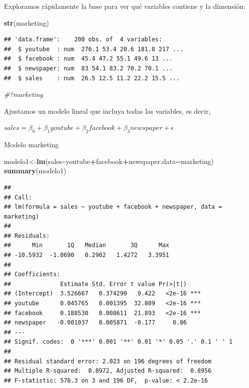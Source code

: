 \documentclass[
]{book}
\newenvironment{Shaded}{\begin{snugshade}}{\end{snugshade}}
\newcommand{\AttributeTok}[1]{\textcolor[rgb]{0.13,0.29,0.53}{#1}}
\newcommand{\CommentTok}[1]{\textcolor[rgb]{0.56,0.35,0.01}{\textit{#1}}}
\newcommand{\FunctionTok}[1]{\textcolor[rgb]{0.13,0.29,0.53}{\textbf{#1}}}
\newcommand{\NormalTok}[1]{#1}
\newcommand{\OtherTok}[1]{\textcolor[rgb]{0.56,0.35,0.01}{#1}}
\newcommand{\SpecialCharTok}[1]{\textcolor[rgb]{0.81,0.36,0.00}{\textbf{#1}}}
\begin{document}
Exploramos rápidamente la base para ver qué variables contiene y la dimensión:

\begin{Shaded}
\begin{Highlighting}[]
\FunctionTok{str}\NormalTok{(marketing)}
\end{Highlighting}
\end{Shaded}

\begin{verbatim}
## 'data.frame':    200 obs. of  4 variables:
##  $ youtube  : num  276.1 53.4 20.6 181.8 217 ...
##  $ facebook : num  45.4 47.2 55.1 49.6 13 ...
##  $ newspaper: num  83 54.1 83.2 70.2 70.1 ...
##  $ sales    : num  26.5 12.5 11.2 22.2 15.5 ...
\end{verbatim}

\begin{Shaded}
\begin{Highlighting}[]
\CommentTok{\#?marketing}
\end{Highlighting}
\end{Shaded}

Ajustamos un modelo lineal que incluya todas las variables, es decir,

\(sales=\beta_0+\beta_1 youtube+\beta_2 facebook+ \beta_3 newspaper+\epsilon\)

Modelo marketing

\begin{Shaded}
\begin{Highlighting}[]
\NormalTok{modelo1}\OtherTok{\textless{}{-}}\FunctionTok{lm}\NormalTok{(sales}\SpecialCharTok{\textasciitilde{}}\NormalTok{youtube}\SpecialCharTok{+}\NormalTok{facebook}\SpecialCharTok{+}\NormalTok{newspaper,}\AttributeTok{data=}\NormalTok{marketing)}
\FunctionTok{summary}\NormalTok{(modelo1)}
\end{Highlighting}
\end{Shaded}

\begin{verbatim}
## 
## Call:
## lm(formula = sales ~ youtube + facebook + newspaper, data = marketing)
## 
## Residuals:
##      Min       1Q   Median       3Q      Max 
## -10.5932  -1.0690   0.2902   1.4272   3.3951 
## 
## Coefficients:
##              Estimate Std. Error t value Pr(>|t|)    
## (Intercept)  3.526667   0.374290   9.422   <2e-16 ***
## youtube      0.045765   0.001395  32.809   <2e-16 ***
## facebook     0.188530   0.008611  21.893   <2e-16 ***
## newspaper   -0.001037   0.005871  -0.177     0.86    
## ---
## Signif. codes:  0 '***' 0.001 '**' 0.01 '*' 0.05 '.' 0.1 ' ' 1
## 
## Residual standard error: 2.023 on 196 degrees of freedom
## Multiple R-squared:  0.8972, Adjusted R-squared:  0.8956 
## F-statistic: 570.3 on 3 and 196 DF,  p-value: < 2.2e-16
\end{verbatim}
\end{document}
